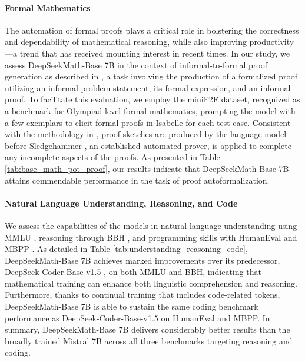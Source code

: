 \begin{itemize}[topsep=0pt]
\paragraph{Formal Mathematics}

The automation of formal proofs plays a critical role in bolstering the correctness and dependability of mathematical reasoning, while also improving productivity—a trend that has received mounting interest in recent times. In our study, we assess DeepSeekMath-Base 7B in the context of informal-to-formal proof generation as described in \citep{dsp_proof}, a task involving the production of a formalized proof utilizing an informal problem statement, its formal expression, and an informal proof. To facilitate this evaluation, we employ the miniF2F \citep{minif2f} dataset, recognized as a benchmark for Olympiad-level formal mathematics, prompting the model with a few exemplars to elicit formal proofs in Isabelle for each test case. Consistent with the methodology in \cite{dsp_proof}, proof sketches are produced by the language model before Sledgehammer \citep{sledgehammer}, an established automated prover, is applied to complete any incomplete aspects of the proofs. As presented in Table \ref{tab:base_math_pot_proof}, our results indicate that DeepSeekMath-Base 7B attains commendable performance in the task of proof autoformalization.

\paragraph{Natural Language Understanding, Reasoning, and Code}

We assess the capabilities of the models in natural language understanding using MMLU \citep{mmlu}, reasoning through BBH \citep{bbh}, and programming skills with HumanEval \citep{codex} and MBPP \citep{mbpp}. As detailed in Table \ref{tab:understanding_reasoning_code}, DeepSeekMath-Base 7B achieves marked improvements over its predecessor, DeepSeek-Coder-Base-v1.5 \citep{deepseek-coder}, on both MMLU and BBH, indicating that mathematical training can enhance both linguistic comprehension and reasoning. Furthermore, thanks to continual training that includes code-related tokens, DeepSeekMath-Base 7B is able to sustain the same coding benchmark performance as DeepSeek-Coder-Base-v1.5 on HumanEval and MBPP. In summary, DeepSeekMath-Base 7B delivers considerably better results than the broadly trained Mistral 7B \citep{mistral} across all three benchmarks targeting reasoning and coding.


\end{itemize}
